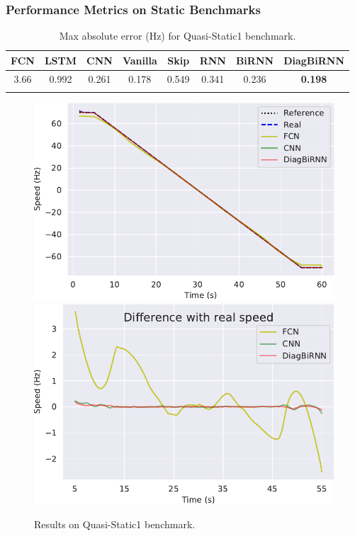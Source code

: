 \documentclass{beamer}
\begin{document}
\begin{frame}
\frametitle{Performance Metrics on Static Benchmarks}


\begin{table}[ht!]
    \centering
    \begin{tabular}{c c c c c c c c}
        \toprule
          \textbf{FCN} & \textbf{LSTM} & \textbf{CNN} & \textbf{Vanilla} & \textbf{Skip} & \textbf{RNN} & \textbf{BiRNN} & \textbf{DiagBiRNN} \\
         \midrule
          3.66 & 0.992 & 0.261 & 0.178 & 0.549 & 0.341 & 0.236 & \textbf{0.198}\\
          \bottomrule
        \vspace{-1em}
        \end{tabular}
    \caption{Max absolute error (Hz) for Quasi-Static1 benchmark.}
    \label{tab:qs}
    \vspace{-1em}
\end{table}

\begin{figure}[ht!]
    \centering
    \includegraphics[scale=0.3]{images/bench5.pdf}
    \includegraphics[scale=0.3]{images/bench5_dif.pdf}
    \vspace{-1em}
    \caption{Results on Quasi-Static1 benchmark.}
    \label{fig:static1}
    \vspace{-1em}
\end{figure}



\end{frame}
\end{document}
